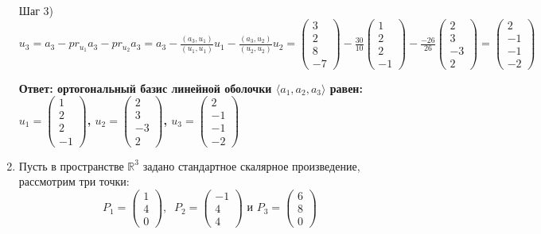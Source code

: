 \documentclass[a4paper,12pt]{article}
\begin{document}
\begin{enumerate}
Шаг 3) $u_3 = a_3  - pr_{u_1}a_3  - pr_{u_2}a_3 = a_3 - \frac{(a_3, u_1)}{(u_1, u_1)} u_1- \frac{(a_3, u_2)}{(u_2, u_2)} u_2 = \begin{pmatrix}
{3}\\{2}\\{8}\\{-7}
\end{pmatrix}-\frac{30}{10} \begin{pmatrix}
{1}\\{2}\\{2}\\{-1}
\end{pmatrix}- \frac{-26}{26} \begin{pmatrix}
{2}\\{3}\\{-3}\\{2}
\end{pmatrix}=\begin{pmatrix}
{2}\\{-1}\\{-1}\\{-2}
\end{pmatrix}$

\textbf{Ответ: ортогональный базис линейной оболочки  $\langle a_1,a_2,a_3\rangle$ равен:\\ $u_1 = \begin{pmatrix}
{1}\\{2}\\{2}\\{-1}
\end{pmatrix}$, $u_2 =\begin{pmatrix}
{2}\\{3}\\{-3}\\{2}
\end{pmatrix}$, $u_3 = \begin{pmatrix}
{2}\\{-1}\\{-1}\\{-2}
\end{pmatrix}$}


\item Пусть в пространстве $\mathbb R^3$ задано стандартное скалярное произведение, рассмотрим три точки:
\[
P_1 = 
\begin{pmatrix}
{1}\\{4}\\{0}
\end{pmatrix},\;\;
P_2 = 
\begin{pmatrix}
{-1}\\{4}\\{4}
\end{pmatrix}\text{ и }
P_3 = 
\begin{pmatrix}
{6}\\{8}\\{0}
\end{pmatrix}
\]


\end{enumerate}
\end{document}

